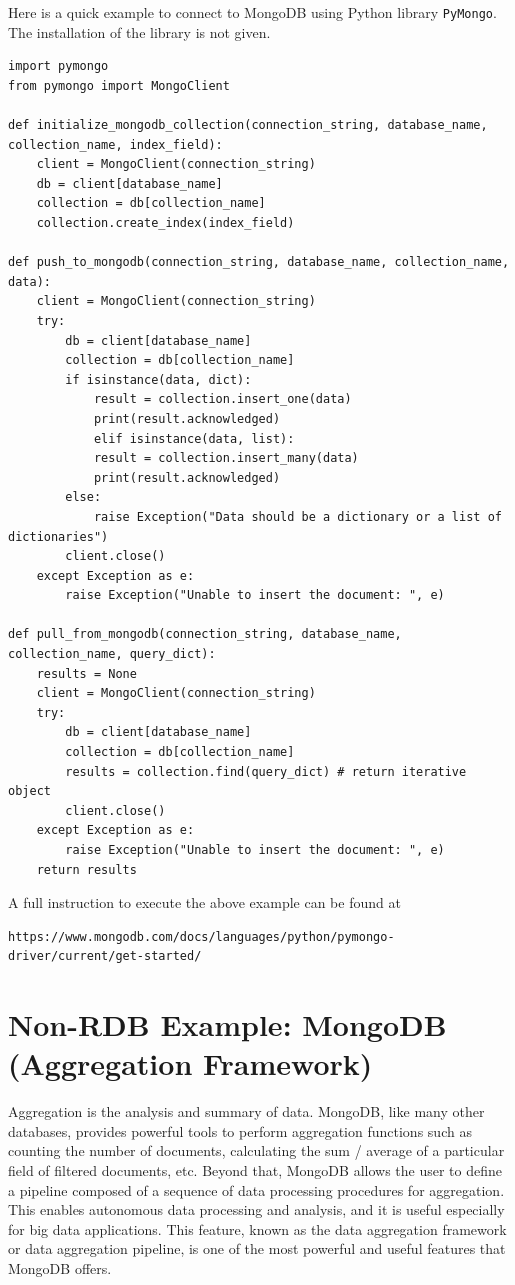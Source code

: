 Here is a quick example to connect to MongoDB using Python library \verb|PyMongo|. The installation of the library is not given.
\begin{lstlisting}
import pymongo
from pymongo import MongoClient

def initialize_mongodb_collection(connection_string, database_name, collection_name, index_field):
	client = MongoClient(connection_string)
	db = client[database_name]
	collection = db[collection_name]
	collection.create_index(index_field)

def push_to_mongodb(connection_string, database_name, collection_name, data):
	client = MongoClient(connection_string)
	try:
		db = client[database_name]
		collection = db[collection_name]
		if isinstance(data, dict):
			result = collection.insert_one(data)
			print(result.acknowledged)
			elif isinstance(data, list):
			result = collection.insert_many(data)
			print(result.acknowledged)
		else:
			raise Exception("Data should be a dictionary or a list of dictionaries")
		client.close()
	except Exception as e:
		raise Exception("Unable to insert the document: ", e)

def pull_from_mongodb(connection_string, database_name, collection_name, query_dict):
	results = None
	client = MongoClient(connection_string)
	try:
		db = client[database_name]
		collection = db[collection_name]
		results = collection.find(query_dict) # return iterative object
		client.close()
	except Exception as e:
		raise Exception("Unable to insert the document: ", e)
	return results

\end{lstlisting}
A full instruction to execute the above example can be found at
\begin{lstlisting}
https://www.mongodb.com/docs/languages/python/pymongo-driver/current/get-started/
\end{lstlisting}

\section{Non-RDB Example: MongoDB (Aggregation Framework)}

Aggregation is the analysis and summary of data. MongoDB, like many other databases, provides powerful tools to perform aggregation functions such as counting the number of documents, calculating the sum / average of a particular field of filtered documents, etc. Beyond that, MongoDB allows the user to define a pipeline composed of a sequence of data processing procedures for aggregation. This enables autonomous data processing and analysis, and it is useful especially for big data applications. This feature, known as the data aggregation framework or data aggregation pipeline, is one of the most powerful and useful features that MongoDB offers.

